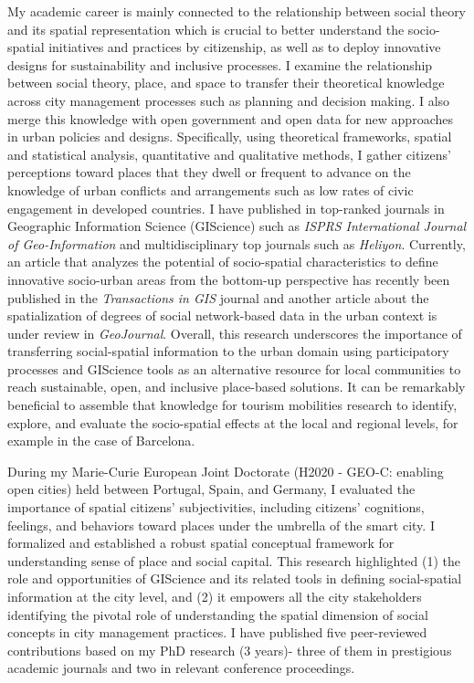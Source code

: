My academic career is mainly connected to the relationship between social theory and its spatial representation which is crucial to better understand the socio-spatial initiatives and practices by citizenship, as well as to deploy innovative designs for sustainability and inclusive processes. I examine the relationship between social theory, place, and space to transfer their theoretical knowledge across city management processes such as planning and decision making. I also merge this knowledge with open government and open data for new approaches in urban policies and designs. Specifically, using theoretical frameworks, spatial and statistical analysis, quantitative and qualitative methods, I gather citizens’ perceptions toward places that they dwell or frequent to advance on the knowledge of urban conflicts and arrangements such as low rates of civic engagement in developed countries. I have published in top-ranked journals in Geographic Information Science (GIScience) such as \textit{ISPRS International Journal of Geo-Information} and multidisciplinary top journals such as \textit{Heliyon}. Currently, an article that analyzes the potential of socio-spatial characteristics to define innovative socio-urban areas from the bottom-up perspective has recently been published in the \textit{Transactions in GIS} journal and another article about the spatialization of degrees of social network-based data in the urban context is under review in \textit{GeoJournal}. Overall, this research underscores the importance of transferring social-spatial information to the urban domain using participatory processes and GIScience tools as an alternative resource for local communities to reach sustainable, open, and inclusive place-based solutions. It can be remarkably beneficial to assemble that knowledge for tourism mobilities research to identify, explore, and evaluate the socio-spatial effects at the local and regional levels, for example in the case of Barcelona.\par


During my Marie-Curie European Joint Doctorate (H2020 - GEO-C: enabling open cities) held between Portugal, Spain, and Germany, I evaluated the importance of spatial citizens’ subjectivities, including citizens’ cognitions, feelings, and behaviors toward places under the umbrella of the smart city. I formalized and established a robust spatial conceptual framework for understanding sense of place and social capital. This research highlighted (1) the role and opportunities of GIScience and its related tools in defining social-spatial information at the city level, and (2) it empowers all the city stakeholders identifying the pivotal role of understanding the spatial dimension of social concepts in city management practices. I have published five peer-reviewed contributions based on my PhD research (3 years)- three of them in prestigious academic journals and two in relevant conference proceedings.\par

